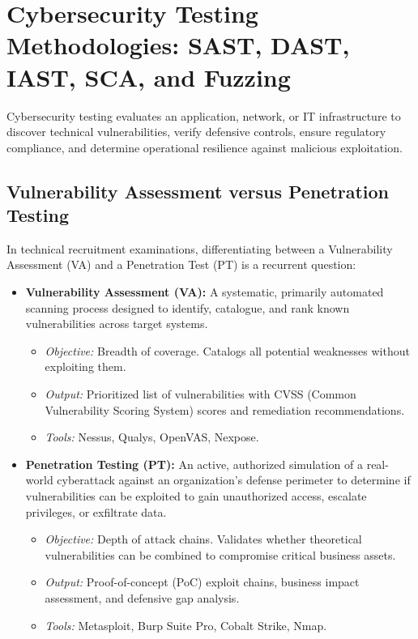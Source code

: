\section{Cybersecurity Testing Methodologies: SAST, DAST, IAST, SCA, and Fuzzing}

Cybersecurity testing evaluates an application, network, or IT infrastructure to discover technical vulnerabilities, verify defensive controls, ensure regulatory compliance, and determine operational resilience against malicious exploitation.

\subsection{Vulnerability Assessment versus Penetration Testing}

In technical recruitment examinations, differentiating between a Vulnerability Assessment (VA) and a Penetration Test (PT) is a recurrent question:

\begin{itemize}
\item \textbf{Vulnerability Assessment (VA):} A systematic, primarily automated scanning process designed to identify, catalogue, and rank known vulnerabilities across target systems.
\begin{itemize}
\item \textit{Objective:} Breadth of coverage. Catalogs all potential weaknesses without exploiting them.
\item \textit{Output:} Prioritized list of vulnerabilities with CVSS (Common Vulnerability Scoring System) scores and remediation recommendations.
\item \textit{Tools:} Nessus, Qualys, OpenVAS, Nexpose.
\end{itemize}

\item \textbf{Penetration Testing (PT):} An active, authorized simulation of a real-world cyberattack against an organization's defense perimeter to determine if vulnerabilities can be exploited to gain unauthorized access, escalate privileges, or exfiltrate data.
\begin{itemize}
\item \textit{Objective:} Depth of attack chains. Validates whether theoretical vulnerabilities can be combined to compromise critical business assets.
\item \textit{Output:} Proof-of-concept (PoC) exploit chains, business impact assessment, and defensive gap analysis.
\item \textit{Tools:} Metasploit, Burp Suite Pro, Cobalt Strike, Nmap.
\end{itemize}
\end{itemize}

